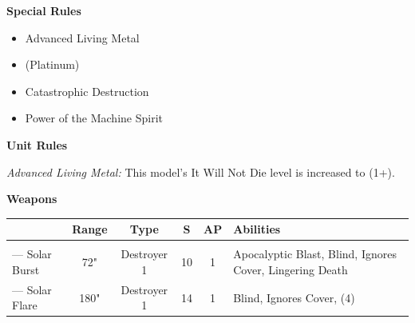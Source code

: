 \begin{minipage}[t]{0.72\textwidth}
\begin{minipage}[t]{0.5\textwidth}
\begin{flushleft}
			\textbf{Special Rules}
			\begin{itemize}
				\item Advanced Living Metal
				\item {} (Platinum)
				\item Catastrophic Destruction
				\item Power of the Machine Spirit
			\end{itemize}
		\end{flushleft}
	\end{minipage}
	
	\vspace*{2em}
	\textbf{Unit Rules}
	
	\textit{Advanced Living Metal:} This model's It Will Not Die level is increased to (1+).
	
	\vspace*{2em}
	\textbf{Weapons}
	
	\begin{tabular}{m{95 pt} *{4}{c} >{\raggedright\arraybackslash}p{130pt}}
		& Range & Type & S & AP & Abilities \\
		\hline
		\quickref{Star Cage} & & & & & \\
		— Solar Burst & 72" & Destroyer 1 & 10 & 1 & Apocalyptic Blast, Blind, Ignores Cover, Lingering Death \\
		— Solar Flare & 180" & Destroyer 1 & 14 & 1 & Blind, Ignores Cover, \quickref{Path of Annihilation} (4)\\
	\end{tabular}
\end{minipage}



\newpage
\subsubsection[Doomsday Monolith]{}


\newpage
\subsubsection[Gauss Pylon]{}

\newpage
\subsubsection[Night Shroud Bomber]{}


\newpage
\subsubsection[Sentry Pylon]{}


